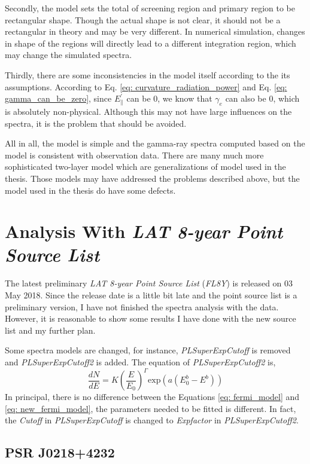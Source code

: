 \documentclass[12pt]{report}
\begin{document}
        Secondly, the model sets the total of screening region and primary region to be 
        rectangular shape. Though the actual shape is not clear, it should not be a 
        rectangular in theory and may be very different. In numerical simulation, changes 
        in shape of the regions will directly lead to a different integration region, 
        which may change the simulated spectra.

        Thirdly, there are some inconsistencies in the model itself according to the its 
        assumptions. According to Eq. \ref{eq: curvature_radiation_power} and Eq. 
        \ref{eq: gamma_can_be_zero}, since $E_{\parallel}^{\prime}$ can be $0$, we know that 
        $\gamma_{e}$ can also be $0$, which is absolutely non-physical. Although this may not 
        have large influences on the spectra, it is the problem that should be avoided.

        All in all, the model is simple and the gamma-ray spectra computed based on the model 
        is consistent with observation data. There are many much more sophisticated 
        two-layer model which are generalizations of model used in the thesis. Those models 
        may have addressed the problems described above, but the model used in the thesis 
        do have some defects. 

    \section{Analysis With \textit{LAT 8-year Point Source List}}
      The latest preliminary \textit{LAT 8-year Point Source List} (\textit{FL8Y}) is released 
      on 03 May 2018. Since the release date is a little bit late and the point source list is a 
      preliminary version, I have not finished the spectra analysis with the data. However, it is 
      reasonable to show some results I have done with the new source list and my further plan.

      Some spectra models are changed, for instance, \textit{PLSuperExpCutoff} is removed and 
      \textit{PLSuperExpCutoff\mbox{2}} is added. The equation of 
      \textit{PLSuperExpCutoff\mbox{2}} \cite{newFermiModel} is,
      \begin{equation}
        \frac{dN}{dE} = K\left(\frac{E}{E_0}\right)^{\Gamma} \mbox{exp}\left(a\left(E_0^b-E^b\right)\right) 
        \label{eq: new_fermi_model}
      \end{equation}
      In principal, there is no difference between the Equations \ref{eq: fermi_model} and 
      \ref{eq: new_fermi_model}, the parameters needed to be fitted is different. In fact, the 
      \textit{Cutoff} in \textit{PLSuperExpCutoff} is changed to \textit{Expfactor} in 
      \textit{PLSuperExpCutoff\mbox{2}}. 
      
      \subsection{PSR J0218+4232}







          
\end{document}
